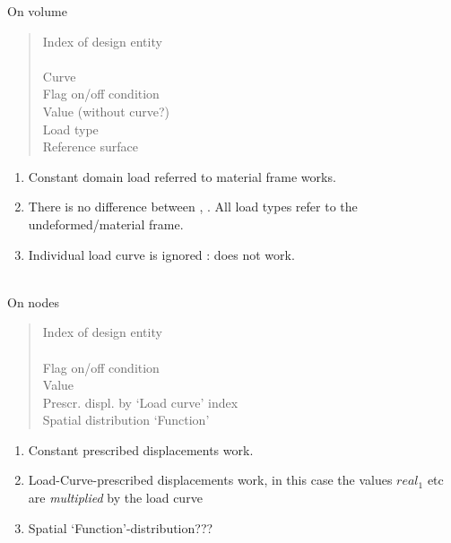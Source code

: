 On volume
\begin{quote}
 \cnl \chs Index of design entity\\
\cod{-} \cnl\\
 \chs Curve\\
 \cnl \chs Flag on/off condition \\
 \cnl \chs Value (without curve?)\\
 \cnl \chs Load type\\
 \chs Reference surface
\end{quote}
\begin{enumerate}
\item Constant domain load referred to material frame works.
\item  There is no difference between , . All load types
  refer to the undeformed/material 
  frame. 
\item Individual load curve is ignored : does not work.
\end{enumerate}


\\
On nodes
\begin{quote}
 \cnl \chs Index of design entity\\
\cod{-} \cnl \\
 \cnl \chs Flag on/off condition \\
 \cnl \chs Value\\
 \cnl
\chs Prescr. displ. by `Load curve' index\\
 \chs Spatial distribution `Function'
\end{quote}
\begin{enumerate}
\item Constant prescribed displacements work.
\item Load-Curve-prescribed displacements work, in this case the values
  $real_1$ etc are \emph{multiplied} by the load curve
\item Spatial `Function'-distribution???
\end{enumerate}

